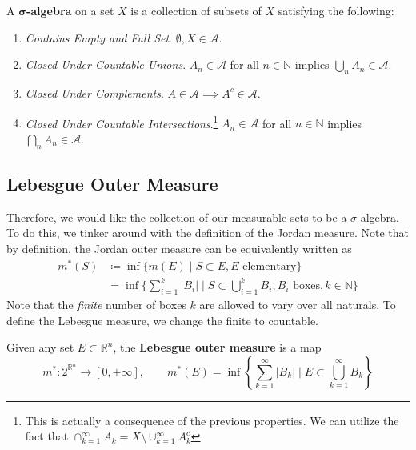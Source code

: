   \begin{definition}
    A \textbf{$\boldsymbol{\sigma}$-algebra} on a set $X$ is a collection of subsets of $X$ satisfying the following: 
    \begin{enumerate}
      \item \textit{Contains Empty and Full Set}. $\emptyset, X \in \mathcal{A}$. 
      \item \textit{Closed Under Countable Unions}. $A_n \in \mathcal{A}$ for all $n \in \mathbb{N}$ implies $\bigcup_n A_n \in \mathcal{A}$. 
      \item \textit{Closed Under Complements}. $A \in \mathcal{A} \implies A^c \in \mathcal{A}$. 
      \item \textit{Closed Under Countable Intersections}.\footnote{This is actually a consequence of the previous properties. We can utilize the fact that $\cap_{k=1}^\infty A_k = X \setminus \cup_{k=1}^\infty A_k^c$ } $A_n \in \mathcal{A}$ for all $n \in \mathbb{N}$ implies $\bigcap_n A_n \in \mathcal{A}$. 
    \end{enumerate}
  \end{definition}

\subsection{Lebesgue Outer Measure}

  Therefore, we would like the collection of our measurable sets to be a $\sigma$-algebra. To do this, we tinker around with the definition of the Jordan measure. Note that by definition, the Jordan outer measure can be equivalently written as 
  \begin{align}
    m^\ast (S) & \coloneqq \inf \{ m(E) \mid S \subset E, E \text{ elementary} \} \\ 
               & = \inf \bigg\{ \sum_{i=1}^k |B_i| \;\bigg|\; S \subset \bigcup_{i=1}^k B_i, B_i \text{ boxes}, k \in \mathbb{N} \bigg\}
  \end{align}
  Note that the \textit{finite} number of boxes $k$ are allowed to vary over all naturals. To define the Lebesgue measure, we change the finite to countable.

  \begin{definition}
    Given any set $E \subset \mathbb{R}^n$, the \textbf{Lebesgue outer measure} is a map 
    \begin{equation}
      m^\ast : 2^{\mathbb{R}^n} \to [0, +\infty], \qquad m^\ast (E) = \inf  \left\{ \sum_{k=1}^\infty |B_k| \; \bigg| \; E \subset \bigcup_{k=1}^\infty B_k \right\} 
    \end{equation}
  \end{definition} 

